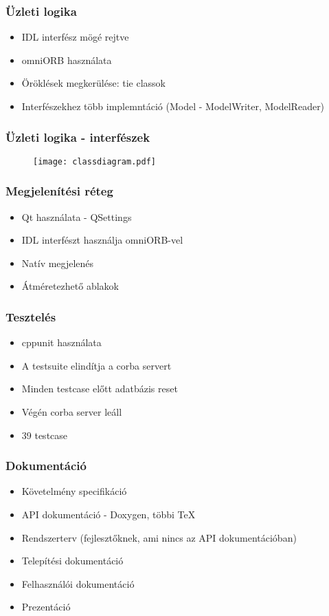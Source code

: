\documentclass[hyperref={pdfpagelabels=false}]{beamer}
\begin{document}
\begin{frame}
\frametitle{Üzleti logika}
\begin{itemize}
\item IDL interfész mögé rejtve
\item omniORB használata
\item Öröklések megkerülése: tie classok
\item Interfészekhez több implemntáció (Model - ModelWriter, ModelReader)
\end{itemize}
\end{frame}

\begin{frame}
\frametitle{Üzleti logika - interfészek}
\begin{figure}[H]
\texttt{[image: classdiagram.pdf]}
\end{figure}
\end{frame}

\begin{frame}
\frametitle{Megjelenítési réteg}
\begin{itemize}
\item Qt használata - QSettings
\item IDL interfészt használja omniORB-vel
\item Natív megjelenés
\item Átméretezhető ablakok
\end{itemize}
\end{frame}

\begin{frame}
\frametitle{Tesztelés}
\begin{itemize}
\item cppunit használata
\item A testsuite elindítja a corba servert
\item Minden testcase előtt adatbázis reset
\item Végén corba server leáll
\item 39 testcase
\end{itemize}
\end{frame}

\begin{frame}
\frametitle{Dokumentáció}
\begin{itemize}
\item Követelmény specifikáció
\item API dokumentáció - Doxygen, többi \TeX{}
\item Rendszerterv (fejlesztőknek, ami nincs az API dokumentációban)
\item Telepítési dokumentáció
\item Felhasználói dokumentáció
\item Prezentáció
\end{itemize}
\end{frame}
\end{document}
